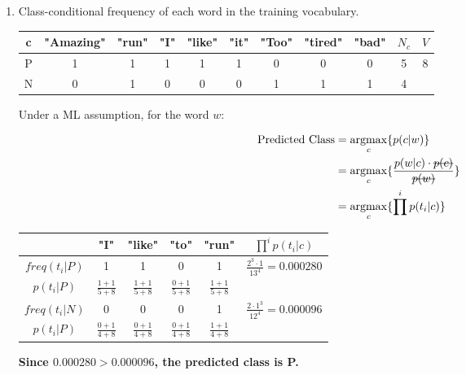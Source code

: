 \documentclass{article}
\DeclareMathOperator*{\argmax}{argmax}
\begin{document}
\begin{enumerate}[leftmargin=\labelsep]
\newpage

\raggedright
\item Class-conditional frequency of each word in the training vocabulary.

\begin{table}[H]
  \centering
  \begin{tabular}{ccccccccccc}
    c & "Amazing" & "run" & "I" & "like" & "it" & "Too" & "tired" & "bad" & $N_c$ & $V$ \\ \midrule
    P & 1 & 1 & 1 & 1 & 1 & 0 & 0 & 0 & 5 & \multirow{2}{*}{8} \\
    N & 0 & 1 & 0 & 0 & 0 & 1 & 1 & 1 & 4 \\
  \end{tabular}
\end{table}

Under a ML assumption, for the word $w$:

\begin{align*}
  \text{Predicted Class} &= \argmax_c \{ p(c|w) \} \\
  &= \argmax_c \{ \frac{p(w|c) \cdot \hbox{\sout{$p(c)$}}}{\hbox{\sout{$p(w)$}}} \} \\
  &= \argmax_c \{ \prod^ip(t_i|c) \}
\end{align*}


\begin{table}[H]
  \centering
  \begin{tabular}{ccccc|c}
     & "I" & "like" & "to" & "run" & $\prod^ip(t_i|c)$ \\ \toprule
    $freq(t_i | P)$ & 1 & 1 & 0 & 1 & \multirow{2}{*}{$\frac{2^3\cdot 1}{13^4}=0.000280$} \\
    $p(t_i|P)$      & $\frac{1+1}{5+8}$ & $\frac{1+1}{5+8}$ & $\frac{0+1}{5+8}$ & $\frac{1+1}{5+8}$ \\ \midrule
    $freq(t_i | N)$ & 0 & 0 & 0 & 1 & \multirow{2}{*}{$\frac{2\cdot 1^3}{12^4}=0.000096$} \\
    $p(t_i|P)$      & $\frac{0+1}{4+8}$ & $\frac{0+1}{4+8}$ & $\frac{0+1}{4+8}$ & $\frac{1+1}{4+8}$ \\
  \end{tabular}
\end{table}

\textbf{
  Since $0.000280 > 0.000096$, the predicted class is P.
}

\centering
{}
\end{enumerate}
\raggedright
\end{document}

